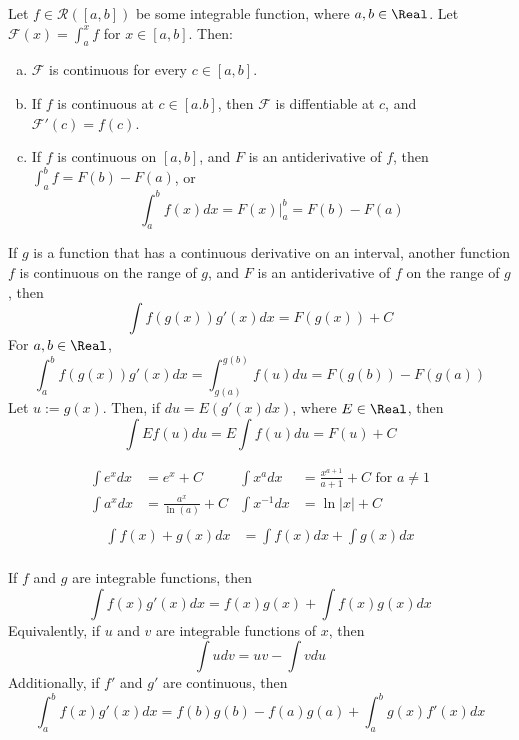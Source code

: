 \begin{theorem}
  Let $f \in \mathcal{R}([a, b])$ be some integrable function, where $a, b \in \Real$. Let $\mathcal{F}(x) = \int_a^x f$ for $x \in [a, b]$. Then:
  \begin{enumerate}[(a)]
    \item $\mathcal{F}$ is continuous for every $c \in [a, b]$.
    \item If $f$ is continuous at $c \in [a. b]$, then $\mathcal{F}$ is diffentiable at $c$, and $\mathcal{F}'(c) = f(c)$.
    \item If $f$ is continuous on $[a, b]$, and $F$ is an antiderivative of $f$, then $\int_a^b f = F(b) - F(a)$, or
      \[
        \int_a^b f(x) dx = F(x) \bigg\rvert_a^b = F(b) - F(a)
      \]
  \end{enumerate}
\end{theorem}

\begin{theorem}
  If $g$ is a function that has a continuous derivative on an interval, another function $f$ is continuous on the range of $g$, and $F$ is an antiderivative of $f$ on the range of $g$, then
  \[
    \int f(g(x)) g'(x) dx = F(g(x)) + C
  \]
  For $a, b \in \Real$,
  \[
    \int_a^b f(g(x))g'(x)dx = \int_{g(a)}^{g(b)} f(u) du = F(g(b)) - F(g(a))
  \]
  Let $u := g(x)$. Then, if $du = E (g'(x) dx)$, where $E \in \Real$, then 
  \[
    \int E f(u) du = E \int f(u) du = F(u) + C
  \]
\end{theorem}

\begin{theorem}
  \[\begin{aligned}
    \int e^x dx &= e^x + C & \int x^a dx &= \frac{x^{a + 1}}{a + 1} + C \text{ for } a \neq 1 \\
    \int a^x dx &= \frac{a^x}{\ln(a)} + C & \int x^{-1} dx &= \ln |x| + C \\
  \end{aligned}\]\[\begin{aligned}
    \int f(x) + g(x) dx &= \int f(x) dx + \int g(x) dx \\
  \end{aligned}\]
\end{theorem}

\begin{theorem}
  If $f$ and $g$ are integrable functions, then
  \[
    \int f(x) g'(x) dx = f(x) g(x) + \int f(x) g(x) dx
  \]
  Equivalently, if $u$ and $v$ are integrable functions of $x$, then
  \[
    \int udv = uv - \int vdu
  \]
  Additionally, if $f'$ and $g'$ are continuous, then
  \[
    \int_a^b f(x) g'(x) dx = f(b)g(b) - f(a)g(a) + \int_a^b g(x) f'(x) dx
  \]
\end{theorem}